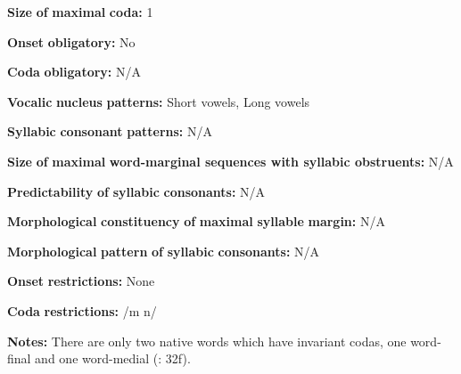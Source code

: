 \documentclass[output=paper]{langsci/langscibook}
\begin{document}
\begin{styleBody}
\textbf{Size} \textbf{of} \textbf{maximal} \textbf{coda:} 1
\end{styleBody}

\begin{styleBody}
\textbf{Onset} \textbf{obligatory:} No
\end{styleBody}

\begin{styleBody}
\textbf{Coda} \textbf{obligatory:} N/A
\end{styleBody}

\begin{styleBody}
\textbf{Vocalic} \textbf{nucleus} \textbf{patterns:} Short vowels, Long vowels
\end{styleBody}

\begin{styleBody}
\textbf{Syllabic} \textbf{consonant} \textbf{patterns:} N/A
\end{styleBody}

\begin{styleBody}
\textbf{Size} \textbf{of} \textbf{maximal} \textbf{word{}-marginal sequences with syllabic obstruents:} N/A
\end{styleBody}

\begin{styleBody}
\textbf{Predictability} \textbf{of} \textbf{syllabic} \textbf{consonants:} N/A
\end{styleBody}

\begin{styleBody}
\textbf{Morphological} \textbf{constituency} \textbf{of} \textbf{maximal} \textbf{syllable} \textbf{margin:} N/A
\end{styleBody}

\begin{styleBody}
\textbf{Morphological} \textbf{pattern} \textbf{of} \textbf{syllabic} \textbf{consonants:} N/A
\end{styleBody}

\begin{styleBody}
\textbf{Onset} \textbf{restrictions:} None
\end{styleBody}

\begin{styleBody}
\textbf{Coda} \textbf{restrictions:} /m n/
\end{styleBody}

\begin{styleBody}
\textbf{Notes:} There are only two native words which have invariant codas, one word-final and one word-medial (\citealt{Pan2012}: 32f).
\end{styleBody}
\end{document}
